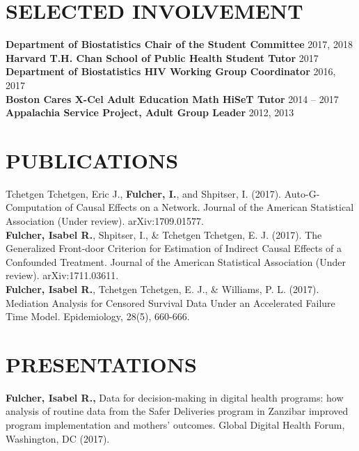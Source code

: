 \documentclass[12pt]{article}
\begin{document}
\section*{\textbf{{\Large S}{\small ELECTED} {\Large I}{\small NVOLVEMENT}}}
\textbf{Department of Biostatistics Chair of the Student Committee} \hfill \hfill 2017, 2018 \\
\textbf{Harvard T.H. Chan School of Public Health Student Tutor} \hfill \hfill 2017 \\
\textbf{Department of Biostatistics HIV Working Group Coordinator} \hfill \hfill 2016, 2017 \\
\textbf{Boston Cares X-Cel Adult Education Math HiSeT Tutor} \hfill \hfill 2014 -- 2017 \\
\textbf{Appalachia Service Project, Adult Group Leader} \hfill \hfill 2012, 2013

\section*{\textbf{{\Large P{\small UBLICATIONS}}}}

Tchetgen Tchetgen, Eric J., \textbf{Fulcher, I.}, and Shpitser, I. (2017). Auto-G-Computation of Causal Effects on a Network. Journal of the American Statistical Association (Under review). arXiv:1709.01577. \\

\textbf{Fulcher, Isabel R.}, Shpitser, I., \& Tchetgen Tchetgen, E. J. (2017). The Generalized Front-door Criterion for Estimation of Indirect Causal Effects of a Confounded Treatment. Journal of the American Statistical Association (Under review). arXiv:1711.03611. \\

\textbf{Fulcher, Isabel R.}, Tchetgen Tchetgen, E. J., \& Williams, P. L. (2017). Mediation Analysis for Censored Survival Data Under an Accelerated Failure Time Model. Epidemiology, 28(5), 660-666. 

\section*{\textbf{{\Large P}{\small RESENTATIONS}}}

\textbf{Fulcher, Isabel R.,} Data for decision-making in digital health programs: how analysis of routine data from the Safer Deliveries program in Zanzibar improved program implementation and mothers' outcomes. Global Digital Health Forum, Washington, DC (2017). \\
\end{document}
